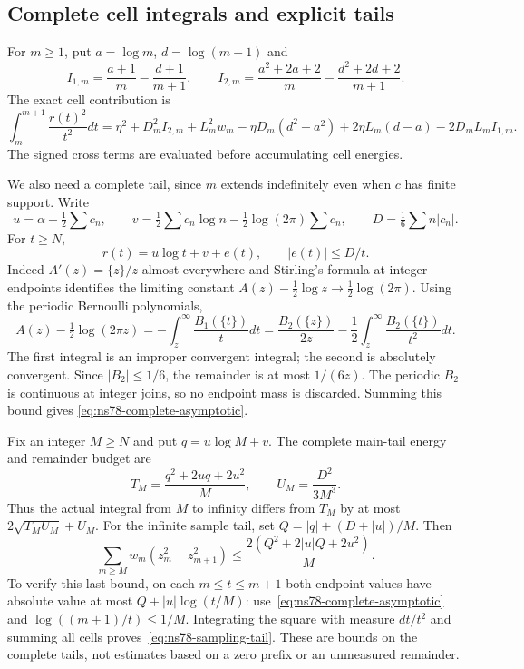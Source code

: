 \subsection{Complete cell integrals and explicit tails}
\label{subsec:ns78-tails}
For $m\geq1$, put $a=\log m$, $d=\log(m+1)$ and
\[
 I_{1,m}=\frac{a+1}{m}-\frac{d+1}{m+1},\qquad
 I_{2,m}=\frac{a^2+2a+2}{m}-\frac{d^2+2d+2}{m+1}.
\]
The exact cell contribution is
\begin{equation}
 \int_m^{m+1}\frac{r(t)^2}{t^2}dt
 =\eta^2+D_m^2I_{2,m}+L_m^2w_m
 -\eta D_m(d^2-a^2)+2\eta L_m(d-a)-2D_mL_mI_{1,m}.
 \label{eq:ns78-exact-cell}
\end{equation}
The signed cross terms are evaluated before accumulating cell energies.

We also need a complete tail, since $m$ extends indefinitely even when
$c$ has finite support. Write
\[
 u=\alpha-\tfrac12\sum c_n,\qquad
 v=\tfrac12\sum c_n\log n-\tfrac12\log(2\pi)\sum c_n,
 \qquad D=\tfrac16\sum n|c_n|.
\]
For $t\geq N$,
\begin{equation}
 r(t)=u\log t+v+e(t),\qquad |e(t)|\leq D/t.
 \label{eq:ns78-complete-asymptotic}
\end{equation}
Indeed $A'(z)=\{z\}/z$ almost everywhere and Stirling's formula at
integer endpoints identifies the limiting constant
$A(z)-\tfrac12\log z\to\tfrac12\log(2\pi)$.
Using the periodic Bernoulli polynomials,
\[
 A(z)-\tfrac12\log(2\pi z)
 =-\int_z^\infty\frac{B_1(\{t\})}{t}dt
 =\frac{B_2(\{z\})}{2z}
       -\frac12\int_z^\infty\frac{B_2(\{t\})}{t^2}dt.
\]
The first integral is an improper convergent integral; the second is
absolutely convergent. Since $|B_2|\leq1/6$, the remainder is at most
$1/(6z)$. The periodic $B_2$ is continuous at integer joins, so no
endpoint mass is discarded. Summing this bound gives
\eqref{eq:ns78-complete-asymptotic}.

Fix an integer $M\geq N$ and put $q=u\log M+v$. The complete
main-tail energy and remainder budget are
\[
 T_M=\frac{q^2+2uq+2u^2}{M},\qquad
 U_M=\frac{D^2}{3M^3}.
\]
Thus the actual integral from $M$ to infinity differs from $T_M$ by
at most $2\sqrt{T_MU_M}+U_M$. For the infinite sample tail, set
$Q=|q|+(D+|u|)/M$. Then
\begin{equation}
 \sum_{m\geq M}w_m(z_m^2+z_{m+1}^2)
 \leq \frac{2(Q^2+2|u|Q+2u^2)}{M}.
 \label{eq:ns78-sampling-tail}
\end{equation}
To verify this last bound, on each $m\leq t\leq m+1$ both endpoint
values have absolute value at most $Q+|u|\log(t/M)$:
use~\eqref{eq:ns78-complete-asymptotic} and
$\log((m+1)/t)\leq1/M$. Integrating the square with measure $dt/t^2$
and summing all cells proves~\eqref{eq:ns78-sampling-tail}.
These are bounds on the complete tails, not estimates based on a zero
prefix or an unmeasured remainder.

